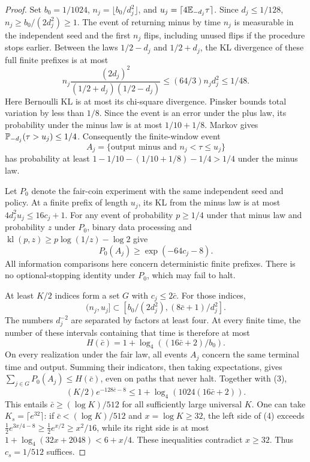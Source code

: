 \begin{proof}
Set $b_0=1/1024$, $n_j=\lfloor b_0/d_j^2\rfloor$, and
$u_j=\lceil4\mathbb E_{-d_j}\tau\rceil$. Since $d_j\le1/128$,
$n_j\ge b_0/(2d_j^2)\ge1$.
The event of returning minus by time $n_j$ is measurable in the independent
seed and the first $n_j$ flips, including unused flips if the procedure stops
earlier. Between the laws $1/2-d_j$ and $1/2+d_j$, the KL divergence of these
full finite prefixes is at most
\[
 n_j\frac{(2d_j)^2}{(1/2+d_j)(1/2-d_j)}
 \le(64/3)n_jd_j^2\le1/48.
\]
Here Bernoulli KL is at most its chi-square divergence. Pinsker bounds total
variation by less than $1/8$. Since the event is an error under the plus law,
its probability under the minus law is at most $1/10+1/8$.
Markov gives $\mathbb P_{-d_j}(\tau>u_j)\le1/4$.
Consequently the finite-window event
\[
 A_j=\{\text{output minus and } n_j<\tau\le u_j\}
\]
has probability at least $1-1/10-(1/10+1/8)-1/4>1/4$ under the minus law.

Let $P_0$ denote the fair-coin experiment with the same independent seed and
policy. At a finite prefix of length $u_j$, its KL from the minus law is at
most $4d_j^2u_j\le16c_j+1$. For any event of probability $p\ge1/4$ under
that minus law and probability $z$ under $P_0$, binary data processing and
$\operatorname{kl}(p,z)\ge p\log(1/z)-\log2$ give
\[
 P_0(A_j)\ge\exp(-64c_j-8).                              \tag{3}
\]
All information comparisons here concern deterministic finite prefixes.
There is no optional-stopping identity under $P_0$, which may fail to halt.

At least $K/2$ indices form a set $G$ with $c_j\le2\bar c$. For those indices,
\[
 (n_j,u_j]\subset
 [b_0/(2d_j^2),(8\bar c+1)/d_j^2].
\]
The numbers $d_j^{-2}$ are separated by factors at least four. At every
finite time, the number of these intervals containing that time is therefore
at most
\[
 H(\bar c)=1+\log_4((16\bar c+2)/b_0).
\]
On every realization under the fair law, all events $A_j$ concern the same
terminal time and output. Summing their indicators, then taking expectations,
gives $\sum_{j\in G}P_0(A_j)\le H(\bar c)$, even on paths that never halt.
Together with (3),
\[
 (K/2)e^{-128\bar c-8}
 \le1+\log_4(1024(16\bar c+2)).                          \tag{4}
\]
This entails $\bar c\ge(\log K)/512$ for all sufficiently large universal
$K$. One can take $K_s=\lceil e^{32}\rceil$: if
$\bar c<(\log K)/512$ and $x=\log K\ge32$, the left side of (4) exceeds
$\tfrac12e^{3x/4-8}\ge\tfrac12e^{x/2}\ge x^2/16$,
while its right side is at most $1+\log_4(32x+2048)<6+x/4$.
These inequalities contradict $x\ge32$. Thus $c_s=1/512$ suffices.
\end{proof}

